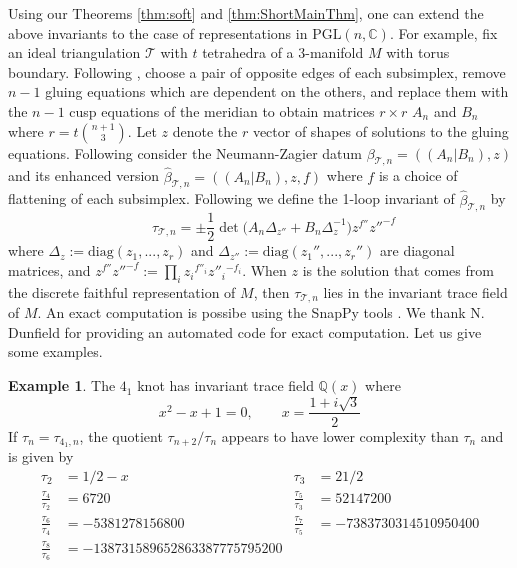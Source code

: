 \documentclass[12pt]{amsart}
\theoremstyle{definition}
\newtheorem{example}[theorem]{Example}
\numberwithin{equation}{section}
\def\BQ{\mathbb Q}
\def\BC{\mathbb C}
\def\b{\beta}
\def\PGL{\mathrm{PGL}}
\def\be{  \begin{equation} }
\def\ee{  \end{equation} }
\def\diag{\text{diag}}
\def\CT{\mathcal T}
\begin{document}
Using our Theorems \ref{thm:soft} and \ref{thm:ShortMainThm}, one can extend 
the above invariants to the case of representations in $\PGL(n,\BC)$.
For example, fix an ideal triangulation $\CT$ with $t$ tetrahedra
of a 3-manifold $M$ with torus boundary. Following \cite[Sec.1.2]{DG},
choose a pair of opposite edges of each subsimplex, remove $n-1$ gluing
equations which are dependent on the others, and replace them with the
$n-1$ cusp equations of the meridian to obtain matrices $r \times r$
$A_n$ and $B_n$ where $r=t\binom{n+1}{3}$. Let $z$ denote the $r$ vector
of shapes of solutions to the gluing equations. Following 
\cite[Defn.1.1]{DG} consider the Neumann-Zagier datum 
$\b_{\CT,n}=((A_n|B_n),z)$ and its enhanced version 
$\hat\b_{\CT,n}=((A_n|B_n),z,f)$ where $f$ is a choice of flattening of each
subsimplex. Following \cite[Defn.1.2]{DG} we define the 1-loop invariant
of $\hat\b_{\CT,n}$ by
%
\be 
\qquad\tau_{\CT,n} = 
\pm \frac12\det\big( A_n\Delta_{z''}
+B_n\Delta_z^{-1}\big)z^{f''}z''^{-f}
\ee
%
where $\Delta_z:=\diag(z_1,...,z_r)$ and 
$\Delta_{z''}:=\diag(z_1'',...,z_r'')$ are diagonal matrices, and  
$z^{f''}z''^{-f} := \prod_i z_i{}^{f''_i}z''_i{}^{-f_i}$. When $z$ is the
solution that comes from the discrete faithful representation of $M$,
then $\tau_{\CT,n}$ lies in the invariant trace field of $M$.
An exact computation is possibe using the SnapPy tools \cite{SnapPy}. 
We thank N. Dunfield for providing an automated code for exact computation. 
Let us give some examples.

\begin{example}
\label{ex:411loop}
The $4_1$ knot has invariant trace field $\BQ(x)$ where 
$$
x^2 - x + 1=0, \qquad x=\frac{1+i \sqrt{3}}{2}
$$
If $\tau_n=\tau_{4_1,n}$, the quotient $\tau_{n+2}/\tau_n$
appears to have lower complexity than $\tau_n$ and is given by
\begin{align*}
\tau_2 &= 1/2 - x &
\tau_3 &= 21/2
\\
\frac{\tau_4}{\tau_2} &= 6720 &
\frac{\tau_5}{\tau_3} &= 52147200
\\
\frac{\tau_6}{\tau_4} &= -5381278156800 &
\frac{\tau_7}{\tau_5} &= -7383730314510950400
\\
\frac{\tau_8}{\tau_6} &= -138731589652863387775795200 &
\end{align*}
\end{example}
\end{document}
